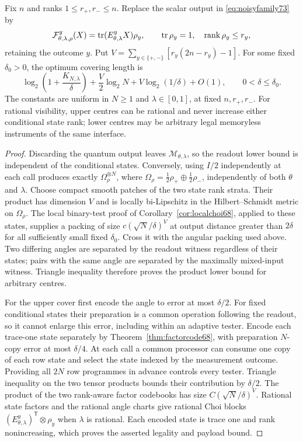 \begin{corollary}\label{cor:noisypreparation73}
Fix $n$ and ranks $1\le r_+,r_-\le n$. Replace the scalar output in
\eqref{eq:noisyfamily73} by
\[
 \mathcal F_{\theta,\lambda,\rho}^{y}(X)
             =\operatorname{tr}(E_{\theta,\lambda}^{y}X)\rho_y,\qquad
 \operatorname{tr}\rho_y=1,\quad\operatorname{rank}\rho_y\le r_y,
\]
retaining the outcome $y$. Put
$V=\sum_{y\in\{+,-\}}[r_y(2n-r_y)-1]$.
For some fixed $\delta_0>0$, the optimum covering length is
\begin{equation}\label{eq:noisyprepbits73}
 \log_2\left(1+\frac{K_{N,\lambda}}\delta\right)
       +\frac V2\log_2N+V\log_2(1/\delta)+O(1),
 \qquad 0<\delta\le\delta_0.
\end{equation}
The constants are uniform in $N\ge1$ and $\lambda\in[0,1]$, at fixed
$n,r_+,r_-$. For rational visibility, upper centres can be rational and never
increase either conditional state rank; lower centres may be arbitrary legal
memoryless instruments of the same interface.
\end{corollary}
\begin{proof}
Discarding the quantum output leaves $\mathcal M_{\theta,\lambda}$,
so the readout lower bound is independent of the conditional states.
Conversely, using $I/2$ independently at each call produces exactly
$\Omega_\rho^{\otimes N}$, where
$\Omega_\rho=\tfrac12\rho_+\oplus\tfrac12\rho_-$, independently of
both $\theta$ and $\lambda$. Choose compact smooth patches of the two
state rank strata. Their product has dimension $V$ and is locally
bi-Lipschitz in the Hilbert--Schmidt metric on $\Omega_\rho$.
The local binary-test proof of Corollary~\ref{cor:localchoi68}, applied
to these states, supplies a packing of size
$c(\sqrt N/\delta)^V$ at output distance greater than $2\delta$ for
all sufficiently small fixed $\delta_0$. Cross it with the angular
packing used above. Two differing angles are separated by the readout
witness regardless of their states; pairs with the same angle are
separated by the maximally mixed-input witness. Triangle inequality
therefore proves the product lower bound for arbitrary centres.

For the upper cover first encode the angle to error at most $\delta/2$.
For fixed conditional states their preparation is a common operation
following the readout, so it cannot enlarge this error, including
within an adaptive tester. Encode each trace-one state separately by
Theorem~\ref{thm:factorcode68}, with preparation $N$-copy error at most
$\delta/4$. At each call a common processor can consume one copy of
each row state and select the state indexed by the measurement outcome.
Providing all $2N$ row programmes in advance controls every tester.
Triangle inequality on the two tensor products bounds their contribution
by $\delta/2$. The product of the two rank-aware factor codebooks has
size $C(\sqrt N/\delta)^V$. Rational state factors and the rational
angle charts give rational Choi blocks
$(E_{\theta,\lambda}^y)^{\mathsf T}\otimes\rho_y$ when $\lambda$
is rational. Each encoded state is trace one and rank nonincreasing,
which proves the asserted legality and payload bound.
\end{proof}

